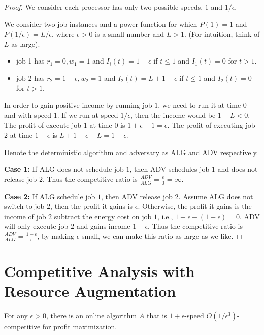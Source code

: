 \documentclass[10 pt,final]{article}
\begin{document}
\begin{proof}
We consider each processor has only two possible speeds, $1$ and $1/\epsilon$.

We consider two job instances and a power function for which $P(1) = 1$ and $P(1/\epsilon) = L/\epsilon$, where $\epsilon > 0$ is a small number and $L>1$. (For intuition, think of $L$ as large). 

\begin{itemize}
\item job 1 has $r_1 = 0, w_1=1$ and $I_i(t) = 1+\epsilon$ if $t \leq 1$ and $I_1(t)=0$ for $t > 1$.
\item job 2 has $r_2 = 1-\epsilon, w_2=1$ and $I_2(t) = L+1-\epsilon$ if $t\leq 1$ and $I_2(t) = 0$ for $t>1$.
\end{itemize}

In order to gain positive income by running job $1$, we need to run it at time $0$ and with speed $1$. If we run at speed $1/\epsilon$, then the income would be $1-L<0$. The profit of execute job $1$ at time $0$ is $1+\epsilon - 1 = \epsilon$. The profit of executing job $2$ at time $1-\epsilon$ is $L+1-\epsilon - L = 1-\epsilon$.

Denote the deterministic algorithm and adversary as ALG and ADV respectively.

\textbf{Case 1:} If ALG does not schedule job $1$, then ADV schedules job $1$ and does not release job $2$. Thus the competitive ratio is $\frac{ADV}{ALG} = \frac{\epsilon}{0} = \infty$. 

\textbf{Case 2:} If ALG schedule job $1$, then ADV release job $2$. Assume ALG does not switch to job $2$, then the profit it gains is $\epsilon$. Otherwise, the profit it gains is the income of job $2$ subtract the energy cost on job $1$, i.e., $1-\epsilon-(1-\epsilon)=0$. ADV will only execute job $2$ and gains income $1-\epsilon$. Thus the competitive ratio is $\frac{ADV}{ALG} = \frac{1-\epsilon}{\epsilon}$, by making $\epsilon$ small, we can make this ratio as large as we like.

\end{proof}


\section{Competitive Analysis with Resource Augmentation}

\begin{lemma} For any $\epsilon > 0$, there is an online algorithm $A$ that is $1+\epsilon$-speed $O(1/\epsilon^3)$-competitive for profit maximization.
\end{lemma}
\end{document}
